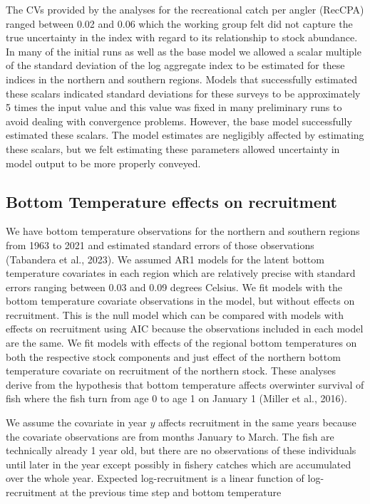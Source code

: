\documentclass[
]{article}
\begin{document}
The CVs provided by the analyses for the recreational catch per angler (RecCPA) ranged between 0.02 and 0.06 which the working group felt did not capture the true uncertainty in the index with regard to its relationship to stock abundance. In many of the initial runs as well as the base model we allowed a scalar multiple of the standard deviation of the log aggregate index to be estimated for these indices in the northern and southern regions. Models that successfully estimated these scalars indicated standard deviations for these surveys to be approximately 5 times the input value and this value was fixed in many preliminary runs to avoid dealing with convergence problems. However, the base model successfully estimated these scalars. The model estimates are negligibly affected by estimating these scalars, but we felt estimating these parameters allowed uncertainty in model output to be more properly conveyed.

\hypertarget{bottom-temperature-effects-on-recruitment}{%
\subsection{Bottom Temperature effects on recruitment}\label{bottom-temperature-effects-on-recruitment}}

We have bottom temperature observations for the northern and southern regions from 1963 to 2021 and estimated standard errors of those observations (Tabandera et al., 2023). We assumed AR1 models for the latent bottom temperature covariates in each region which are relatively precise with standard errors ranging between 0.03 and 0.09 degrees Celsius. We fit models with the bottom temperature covariate observations in the model, but without effects on recruitment. This is the null model which can be compared with models with effects on recruitment using AIC because the observations included in each model are the same. We fit models with effects of the regional bottom temperatures on both the respective stock components and just effect of the northern bottom temperature covariate on recruitment of the northern stock. These analyses derive from the hypothesis that bottom temperature affects overwinter survival of fish where the fish turn from age 0 to age 1 on January 1 (Miller et al., 2016).

We assume the covariate in year \(y\) affects recruitment in the same years because the covariate observations are from months January to March. The fish are technically already 1 year old, but there are no observations of these individuals until later in the year except possibly in fishery catches which are accumulated over the whole year. Expected log-recruitment is a linear function of log-recruitment at the previous time step and bottom temperature
\end{document}
